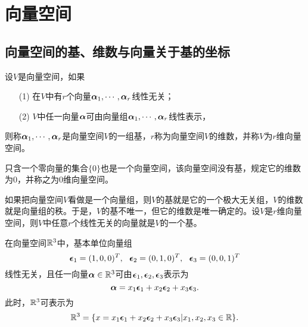\section{向量空间}

\subsection{向量空间的基、维数与向量关于基的坐标}

\begin{frame}\ft{\subsecname}

\begin{dingyi}
  设$V$是向量空间，如果
  \begin{itemize}
  \item[(1)] 在$V$中有$r$个向量$\boldsymbol{\alpha}_1,\cdots,\boldsymbol{\alpha}_r$线性无关；
  \item[(2)] $V$中任一向量$\boldsymbol{\alpha}$可由向量组$\boldsymbol{\alpha}_1,\cdots,\boldsymbol{\alpha}_r$线性表示，
  \end{itemize}
  则称$\boldsymbol{\alpha}_1,\cdots,\boldsymbol{\alpha}_r$是向量空间$V$的一组基，$r$称为向量空间$V$的维数，并称$V$为$r$维向量空间。
\end{dingyi}
\end{frame}

\begin{frame}\ft{\subsecname}
\begin{zhu}
  只含一个零向量的集合$\{0\}$也是一个向量空间，该向量空间没有基，规定它的维数为$0$，并称之为$0$维向量空间。
\end{zhu}

\begin{zhu}
  如果把向量空间$V$看做是一个向量组，则$V$的基就是它的一个极大无关组，$V$的维数就是向量组的秩。于是，$V$的基不唯一，但它的维数是唯一确定的。设$V$是$r$维向量空间，则$V$中任意$r$个线性无关的向量就是$V$的一个基。
\end{zhu}
\end{frame}

\begin{frame}\ft{\subsecname}

\begin{li}
  在向量空间$\mathbb R^3$中，基本单位向量组
  $$
  \boldsymbol{\epsilon}_1=(1,0,0)^T,~~
  \boldsymbol{\epsilon}_2=(0,1,0)^T,~~
  \boldsymbol{\epsilon}_3=(0,0,1)^T
  $$
  线性无关，且任一向量$\boldsymbol{\alpha}\in \mathbb R^3$可由$\boldsymbol{\epsilon}_1,\boldsymbol{\epsilon}_2,\boldsymbol{\epsilon}_3$表示为
  $$
  \boldsymbol{\alpha}=x_1\boldsymbol{\epsilon}_1+x_2\boldsymbol{\epsilon}_2+x_3\boldsymbol{\epsilon}_3.
  $$
  此时，$\mathbb R^3$可表示为
  $$
  \mathbb R^3=\{x=x_1\boldsymbol{\epsilon}_1+x_2\boldsymbol{\epsilon}_2+x_3\boldsymbol{\epsilon}_3|x_1,x_2,x_3\in\mathbb R\}.
  $$
\end{li}

\end{frame}

